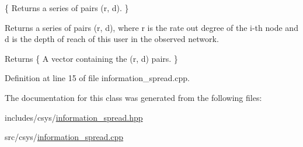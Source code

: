 \{ Returns a series of pairs (r, d). \} 

Returns a series of pairs (r, d), where r is the rate out degree of the i-\/th node and d is the depth of reach of this user in the observed network.

\begin{DoxyReturn}{Returns}
\{ A vector containing the (r, d) pairs. \} 
\end{DoxyReturn}


Definition at line 15 of file information\-\_\-spread.\-cpp.



The documentation for this class was generated from the following files\-:\begin{DoxyCompactItemize}
\item 
includes/csys/\hyperlink{information__spread_8hpp}{information\-\_\-spread.\-hpp}\item 
src/csys/\hyperlink{information__spread_8cpp}{information\-\_\-spread.\-cpp}\end{DoxyCompactItemize}
